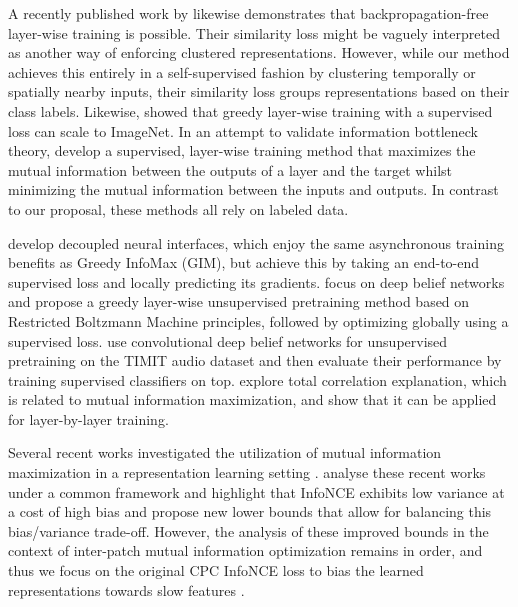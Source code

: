 \documentclass{article}
\begin{document}
A recently published work by \cite{nokland2019training} likewise demonstrates that backpropagation-free layer-wise training is possible. Their similarity loss might be vaguely interpreted as another way of enforcing clustered representations. However, while our method achieves this entirely in a self-supervised fashion by clustering temporally or spatially nearby inputs, their similarity loss groups representations based on their class labels. Likewise, \citet{belilovsky2019greedy} showed that greedy layer-wise training with a supervised loss can scale to ImageNet. In an attempt to validate information bottleneck theory, \citet{elad2018effectiveness} develop a supervised, layer-wise training method that maximizes the mutual information between the outputs of a layer and the target whilst minimizing the mutual information between the inputs and outputs. In contrast to our proposal, these methods all rely on labeled data.

\citet{jaderberg2017decoupled} develop decoupled neural interfaces, which enjoy the same asynchronous training benefits as Greedy InfoMax (GIM), but achieve this by taking an end-to-end supervised loss and locally predicting its gradients. \citet{hinton2006fast, bengio2007greedy} focus on deep belief networks and propose a greedy layer-wise unsupervised pretraining method based on Restricted Boltzmann Machine principles, followed by optimizing globally using a supervised loss. \citet{lee2009unsupervised} use convolutional deep belief networks for unsupervised pretraining on the TIMIT audio dataset and then evaluate their performance by training supervised classifiers on top.  \citet{Gao2018-zv,Ver_Steeg2015-ce} explore total correlation explanation, which is related to mutual information maximization, and show that it can be applied for layer-by-layer training. 



Several recent works investigated the utilization of mutual information maximization in a representation learning setting \citep{mcallester2018information,oord2018representation,hjelm2018learning,belghazi2018mine}. \citet{poolevariational} analyse these recent works under a common framework and highlight that InfoNCE exhibits low variance at a cost of high bias and propose new lower bounds that allow for balancing this bias/variance trade-off. However, the analysis of these improved bounds in the context of inter-patch mutual information optimization remains in order, and thus we focus on the original CPC InfoNCE loss to bias the learned representations towards slow features \citep{Wiskott2002-dn}.
\end{document}
